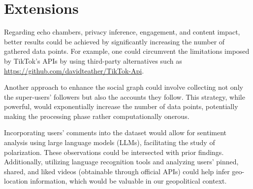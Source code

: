 \section{Extensions}

Regarding echo chambers, privacy inference, engagement, and content impact, better results could be achieved by significantly increasing the number of gathered data points. For example, one could circumvent the limitations imposed by TikTok's APIs by using third-party alternatives such as \url{https://github.com/davidteather/TikTok-Api}.

Another approach to enhance the social graph could involve collecting not only the super-users' followers but also the accounts they follow. This strategy, while powerful, would exponentially increase the number of data points, potentially making the processing phase rather computationally onerous.

Incorporating users' comments into the dataset would allow for sentiment analysis using large language models (LLMs), facilitating the study of polarization. These observations could be intersected with prior findings. Additionally, utilizing language recognition tools and analyzing users' pinned, shared, and liked videos (obtainable through official APIs) could help infer geo-location information, which would be valuable in our geopolitical context.